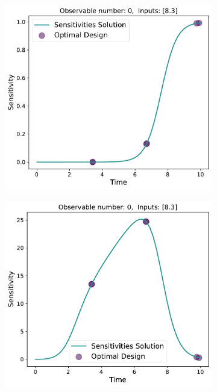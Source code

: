 \documentclass[10pt,A4paper]{article}
\begin{document}
\begin{figure}[H]
    \begin{subfigure}{.48\textwidth}
      \centering
      \includegraphics[scale=0.38]{Figures/Sensitivities_Results_baranyi_roberts_ode_fisher_determinant_rel_sensit_cont_6times_1temps_v20_000_x_00_p_00.pdf}
    \end{subfigure}
    \begin{subfigure}{.48\textwidth}
      \centering
      \includegraphics[scale=0.38]{Figures/Sensitivities_Results_baranyi_roberts_ode_fisher_determinant_rel_sensit_cont_6times_1temps_v20_000_x_00_p_01.pdf}
    \end{subfigure}


\end{figure}
\end{document}
